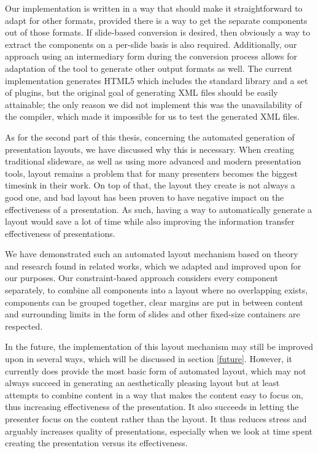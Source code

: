    Our implementation is written in a way that should make it straightforward
   to adapt for other formats, provided there is a way to get the separate
   components out of those formats. If slide-based conversion is desired, then
   obviously a way to extract the components on a per-slide basis is also
   required. Additionally, our approach using an intermediary form during the
   conversion process allows for adaptation of the tool to generate other
   output formats as well. The current implementation generates HTML5 which
   includes the \mxp standard library and a set of plugins, but the original
   goal of generating \mxp XML files should be easily attainable; the only
   reason we did not implement this was the unavailability of the \mxp
   compiler, which made it impossible for us to test the generated XML files.

   As for the second part of this thesis, concerning the automated generation
   of presentation layouts, we have discussed why this is necessary. When
   creating traditional slideware, as well as using more advanced and modern
   presentation tools, layout remains a problem that for many presenters
   becomes the biggest timesink in their work. On top of that, the layout they
   create is not always a good one, and bad layout has been proven to have
   negative impact on the effectiveness of a presentation. As such, having a
   way to automatically generate a layout would save a lot of time while also
   improving the information transfer effectiveness of presentations.

   We have demonstrated such an automated layout mechanism based on theory and
   research found in related works, which we adapted and improved upon for our
   purposes. Our constraint-based approach considers every component
   separately, to combine all components into a layout where no overlapping
   exists, components can be grouped together, clear margins are put in between
   content and surrounding limits in the form of slides and other fixed-size
   containers are respected.

   In the future, the implementation of this layout mechanism may still be
   improved upon in several ways, which will be discussed in section
   \ref{future}. However, it currently does provide the most basic form of automated
   layout, which may not always succeed in generating an aesthetically pleasing
   layout but at least attempts to combine content in a way that makes the
   content easy to focus on, thus increasing effectiveness of the presentation.
   It also succeeds in letting the presenter focus on the content rather than
   the layout. It thus reduces stress and arguably increases quality of
   presentations, especially when we look at time spent creating the
   presentation versus its effectiveness.

